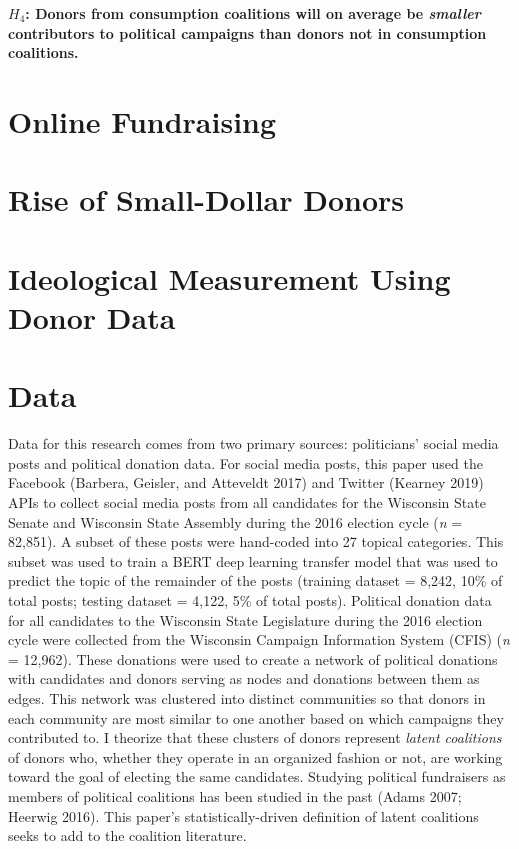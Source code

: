 \documentclass[12pt,]{article}
\begin{document}
\textbf{\(H_{4}\): Donors from consumption coalitions will on average be
\emph{smaller} contributors to political campaigns than donors not in
consumption coalitions.}

\hypertarget{online-fundraising}{%
\section{Online Fundraising}\label{online-fundraising}}

\hypertarget{rise-of-small-dollar-donors}{%
\section{Rise of Small-Dollar
Donors}\label{rise-of-small-dollar-donors}}

\hypertarget{ideological-measurement-using-donor-data}{%
\section{Ideological Measurement Using Donor
Data}\label{ideological-measurement-using-donor-data}}

\hypertarget{data}{%
\section{Data}\label{data}}

Data for this research comes from two primary sources: politicians'
social media posts and political donation data. For social media posts,
this paper used the Facebook (Barbera, Geisler, and Atteveldt 2017) and
Twitter (Kearney 2019) APIs to collect social media posts from all
candidates for the Wisconsin State Senate and Wisconsin State Assembly
during the 2016 election cycle (\emph{n} = 82,851). A subset of these
posts were hand-coded into 27 topical categories. This subset was used
to train a BERT deep learning transfer model that was used to predict
the topic of the remainder of the posts (training dataset = 8,242, 10\%
of total posts; testing dataset = 4,122, 5\% of total posts). Political
donation data for all candidates to the Wisconsin State Legislature
during the 2016 election cycle were collected from the Wisconsin
Campaign Information System (CFIS) (\emph{n} = 12,962). These donations
were used to create a network of political donations with candidates and
donors serving as nodes and donations between them as edges. This
network was clustered into distinct communities so that donors in each
community are most similar to one another based on which campaigns they
contributed to. I theorize that these clusters of donors represent
\emph{latent coalitions} of donors who, whether they operate in an
organized fashion or not, are working toward the goal of electing the
same candidates. Studying political fundraisers as members of political
coalitions has been studied in the past (Adams 2007; Heerwig 2016). This
paper's statistically-driven definition of latent coalitions seeks to
add to the coalition literature.
\end{document}
